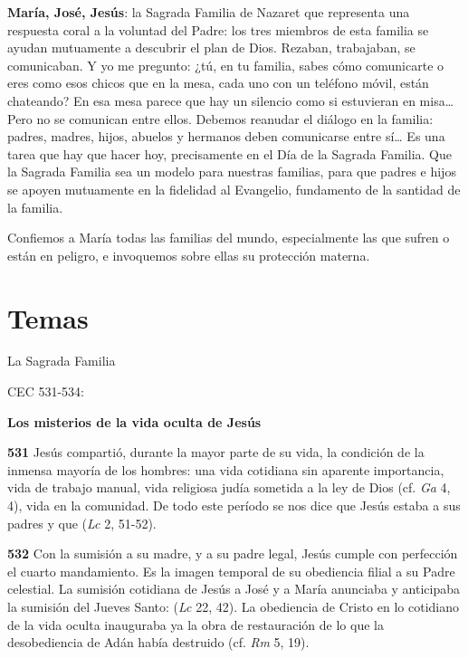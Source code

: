 \begin{body}
\begin{body}
\textbf{María, José, Jesús}: la Sagrada Familia de Nazaret que representa una respuesta coral a la voluntad del Padre: los tres miembros de esta familia se ayudan mutuamente a descubrir el plan de Dios. Rezaban, trabajaban, se comunicaban. Y yo me pregunto: ¿tú, en tu familia, sabes cómo comunicarte o eres como esos chicos que en la mesa, cada uno con un teléfono móvil, están chateando? En esa mesa parece que hay un silencio como si estuvieran en misa\ldots{} Pero no se comunican entre ellos. Debemos reanudar el diálogo en la familia: padres, madres, hijos, abuelos y hermanos deben comunicarse entre sí\ldots{} Es una tarea que hay que hacer hoy, precisamente en el Día de la Sagrada Familia. Que la Sagrada Familia sea un modelo para nuestras familias, para que padres e hijos se apoyen mutuamente en la fidelidad al Evangelio, fundamento de la santidad de la familia.

Confiemos a María  todas las familias del mundo, especialmente las que sufren o están en peligro, e invoquemos sobre ellas su protección materna.


\section{Temas}

La Sagrada Familia

CEC 531-534:

\textbf{Los misterios de la vida oculta de Jesús}

\textbf{531} Jesús compartió, durante la mayor parte de su vida, la condición de la inmensa mayoría de los hombres: una vida cotidiana sin aparente importancia, vida de trabajo manual, vida religiosa judía sometida a la ley de Dios (cf. \emph{Ga} 4, 4), vida en la comunidad. De todo este período se nos dice que Jesús estaba  a sus padres y que  (\emph{Lc} 2, 51-52).

\textbf{532} Con la sumisión a su madre, y a su padre legal, Jesús cumple con perfección el cuarto mandamiento. Es la imagen temporal de su obediencia filial a su Padre celestial. La sumisión cotidiana de Jesús a José y a María anunciaba y anticipaba la sumisión del Jueves Santo:  (\emph{Lc} 22, 42). La obediencia de Cristo en lo cotidiano de la vida oculta inauguraba ya la obra de restauración de lo que la desobediencia de Adán había destruido (cf. \emph{Rm} 5, 19).


\end{body}
\end{body}
